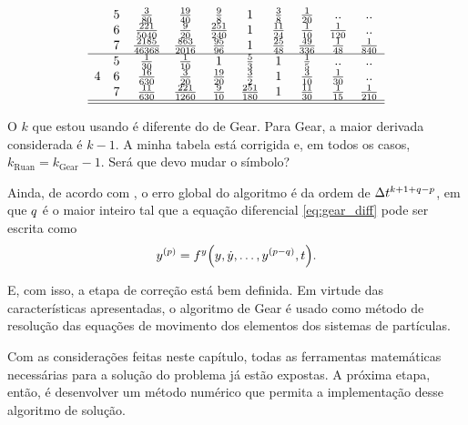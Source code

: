 \begin{table}[h]
\begin{equation*}
\begin{array}{cccccccccc}
		& 5 & \frac{3}{80} & \frac{19}{40} & \frac{9}{8} & 1 & \frac{3}{8} & \frac{1}{20} & \emptyTableEntry & \emptyTableEntry \\
		& 6 & \frac{221}{5040} & \frac{9}{20} & \frac{251}{240} & 1 & \frac{11}{24} & \frac{1}{10} & \frac{1}{120} & \emptyTableEntry \\
		& 7 & \frac{2185}{46368} & \frac{863}{2016} & \frac{95}{96} & 1 & \frac{25}{48} & \frac{49}{336} & \frac{1}{48} & \frac{1}{840} \\
	\hline
		\multirow{3}{*}{4} 
		& 5 & \frac{1}{30} & \frac{1}{10} & 1 & \frac{5}{3} & 1 & \frac{1}{5} & \emptyTableEntry & \emptyTableEntry \\
		& 6 & \frac{16}{630} & \frac{3}{20} & \frac{19}{20} & \frac{3}{2} & 1 & \frac{3}{10} & \frac{1}{30} & \emptyTableEntry \\
		& 7 & \frac{11}{630} & \frac{221}{1260} & \frac{9}{10} & \frac{251}{180} & 1 & \frac{11}{30} & \frac{1}{15} & \frac{1}{210} \\
	\hline
	\hline	
		\end{array}
	\end{equation*}
\end{table}

\alert{O \(k\) que estou usando é diferente do de Gear. Para Gear, a maior derivada considerada é \(k-1\). A minha tabela está corrigida e, em todos os casos, \(k_{\text{Ruan}} = k_{\text{Gear}}-1 \). Será que devo mudar o símbolo?}

Ainda, de acordo com , o erro global do algoritmo é da ordem de \(\Delta t_{}^{k+1+q-p}\), em que \(q\) é o maior inteiro tal que a equação diferencial \eqref{eq:gear_diff} pode ser escrita como
\begin{equation} \label{eq:smaller_diff}
	\deriv{\eqOrder}{y} = \eqFor{y}\pqty{y, \deriv{1}{y},\dotsc,\deriv{\eqOrder-\maxDerivOrder}{y}, t}.
\end{equation}

E, com isso, a etapa de correção está bem definida. Em virtude das características apresentadas, o algoritmo de Gear é usado como método de resolução das equações de movimento dos elementos dos sistemas de partículas.

Com as considerações feitas neste capítulo, todas as ferramentas matemáticas necessárias para a solução do problema já estão expostas. A próxima etapa, então, é desenvolver um método numérico que permita a implementação desse algoritmo de solução.

